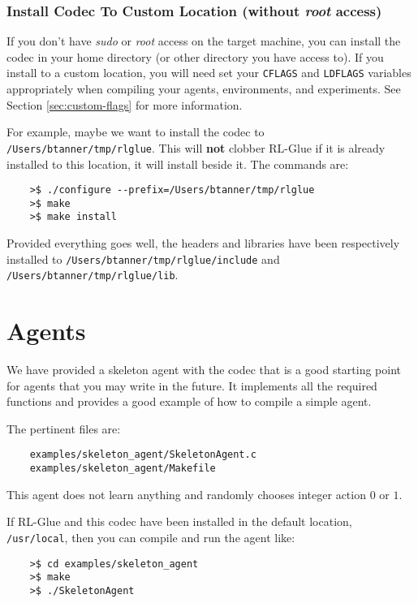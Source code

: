 \documentclass[11pt]{article}
\begin{document}
\subsubsection{Install Codec To Custom Location (without \textit{root} access)}
If you don't have \textit{sudo} or \textit{root} access on the target machine, you can install the codec in your home directory (or other directory you have access to).
If you install to a custom location, you will need set your \texttt{CFLAGS} and \texttt{LDFLAGS} variables appropriately when compiling your agents, environments, and experiments. See Section \ref{sec:custom-flags} for more information.

For example, maybe we want to install the codec to \texttt{/Users/btanner/tmp/rlglue}.  This will \textbf{not} clobber RL-Glue if it is already installed to this location, it will install beside it.  The commands are:
\begin{verbatim}
	>$ ./configure --prefix=/Users/btanner/tmp/rlglue
	>$ make
	>$ make install
\end{verbatim}

Provided everything goes well, the headers and libraries have been respectively installed to\newline
\texttt{/Users/btanner/tmp/rlglue/include} and \texttt{/Users/btanner/tmp/rlglue/lib}.




\section{Agents}
\label{sec:agent}
We have provided a skeleton agent with the codec that is a good starting point for agents that you may write in the future.
It implements all the required functions and provides a good example of how to compile a simple agent.

The pertinent files are:
\begin{verbatim}
	examples/skeleton_agent/SkeletonAgent.c
	examples/skeleton_agent/Makefile
\end{verbatim}

This agent does not learn anything and randomly chooses integer action $0$ or $1$.  

If RL-Glue and this codec have been installed in the default location, \texttt{/usr/local}, then you can compile and run the agent like:
\begin{verbatim}
	>$ cd examples/skeleton_agent
	>$ make
	>$ ./SkeletonAgent
\end{verbatim}
\end{document}

